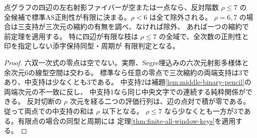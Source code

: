 \begin{corollary}\label{cor:low-opposite-point-graph-as}
点グラフの四辺の左右射影ファイバーが空または一点なら、反対階数 $\rho\le7$ の
全候補で標準AS正則性が有限に決まる。$\rho<6$ は全て除外される。
$\rho=6,7$ の場合は三支持が三次元の縮約の有無を調べ、なければ除外、
あれば一つの縮約で前定理を適用する。
特に四辺が有限な枝は $\rho\le7$ の全域で、全次数の正則性と印を指定しない添字保持同型・周期が
有限判定となる。
\end{corollary}
\begin{proof}
六双一次式の零点は空でない。実際、Segre埋込みの六次元射影多様体と余次元6の線型空間は交わる。
標準なら任意の零点で三次縮約の両端支持は3であり、中支持は少なくとも3である。
中支持2は補題\ref{lem:middle-binary-pencil}の両端次元の不一致に反し、
中支持1なら同じ中央文字での連続する純粋関係ができる。
反対切断の $\rho$ 次元を経る二つの評価行列は、辺の点対で積が零である。
従って両点での中支持の和は $\rho$ 以下となる。
$\rho\le7$ なら少なくとも一方が3である。有限点の場合の同型と周期には
定理\ref{thm:finite-all-window-keys}を適用する。
\end{proof}

